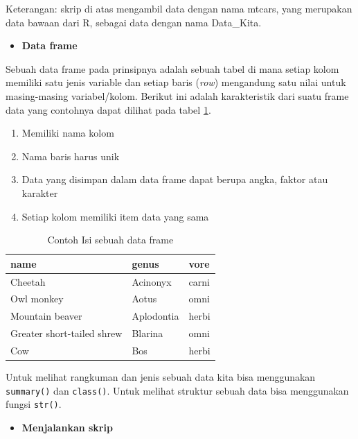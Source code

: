 \documentclass[]{book}
\providecommand{\tightlist}{%
  \setlength{\itemsep}{0pt}\setlength{\parskip}{0pt}}
\begin{document}
Keterangan: skrip di atas mengambil data dengan nama mtcars, yang
merupakan data bawaan dari R, sebagai data dengan nama Data\_Kita.

\begin{itemize}
\tightlist
\item
  \textbf{Data frame}
\end{itemize}

Sebuah data frame pada prinsipnya adalah sebuah tabel di mana setiap
kolom memiliki satu jenis variable dan setiap baris (\emph{row})
mengandung satu nilai untuk masing-masing variabel/kolom. Berikut ini
adalah karakteristik dari suatu frame data yang contohnya dapat dilihat
pada tabel \ref{tab:contohtable}.

\begin{enumerate}
\def\labelenumi{\arabic{enumi}.}
\tightlist
\item
  Memiliki nama kolom
\item
  Nama baris harus unik
\item
  Data yang disimpan dalam data frame dapat berupa angka, faktor atau
  karakter
\item
  Setiap kolom memiliki item data yang sama
\end{enumerate}

\begin{table}

\caption{\label{tab:contohtable}Contoh Isi sebuah data frame}
\centering
\begin{tabular}[t]{l|l|l}
\hline
name & genus & vore\\
\hline
Cheetah & Acinonyx & carni\\
\hline
Owl monkey & Aotus & omni\\
\hline
Mountain beaver & Aplodontia & herbi\\
\hline
Greater short-tailed shrew & Blarina & omni\\
\hline
Cow & Bos & herbi\\
\hline
\end{tabular}
\end{table}

Untuk melihat rangkuman dan jenis sebuah data kita bisa menggunakan
\texttt{summary()} dan \texttt{class()}. Untuk melihat struktur sebuah
data bisa menggunakan fungsi \texttt{str()}.

\begin{itemize}
\tightlist
\item
  \textbf{Menjalankan skrip}
\end{itemize}
\end{document}
